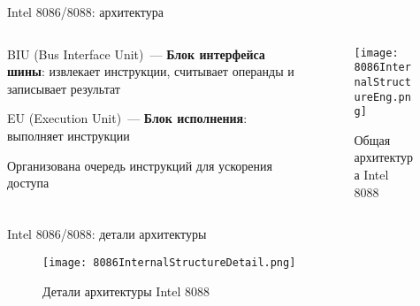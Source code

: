 \documentclass[aspectratio=169,14pt]{beamer}
\begin{document}
\begin{frame}{Intel 8086/8088: архитектура}
    \begin{columns}[T,onlytextwidth]
        \begin{column}{0.5\textwidth}
            \begin{itemize}
                \begin{spacing}{0.8}
                \item BIU (Bus Interface Unit)~--- \textbf{Блок интерфейса шины}: извлекает
                инструкции, считывает операнды и записывает результат
                \item EU (Execution Unit)~--- \textbf{Блок исполнения}: выполняет
                инструкции
                \item Организована очередь инструкций для ускорения доступа
                \end{spacing}
            \end{itemize}
        \end{column}
        \begin{column}{0.5\textwidth}
            \begin{figure}[htp]
                \centering
                \texttt{[image: 8086InternalStructureEng.png]}
                \captionsetup{skip=-5pt}
                \caption{\tiny{Общая архитектура Intel 8088}}
            \end{figure}
        \end{column}
    \end{columns}
\end{frame}

\begin{frame}{Intel 8086/8088: детали архитектуры}
    \begin{figure}[htp]
        \centering
        \texttt{[image: 8086InternalStructureDetail.png]}
        \captionsetup{skip=-5pt}
        \caption{\tiny{Детали архитектуры Intel 8088}}
    \end{figure}
\end{frame}
\end{document}
